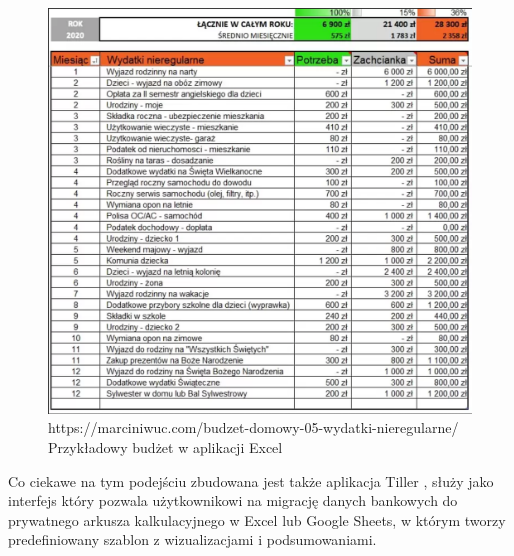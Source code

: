 \documentclass[a4paper,10pt, twoside]{report}
\begin{document}
\begin{large}
\begin{figure}[H]           %
    \centering
    \includegraphics[width=12cm]{figures/marciniwuc.com_Wydatki-nieregularne-plan-roczny.png}
    \caption{https://marciniwuc.com/budzet-domowy-05-wydatki-nieregularne/ Przykładowy budżet w aplikacji Excel}
    \label{fig:budzetprzykladowyexcel}
\end{figure}

{Co ciekawe na tym podejściu zbudowana jest także aplikacja Tiller \cite{tiller},
 służy jako interfejs który pozwala użytkownikowi na migrację danych bankowych 
do prywatnego arkusza kalkulacyjnego w Excel lub Google Sheets, w którym tworzy 
predefiniowany szablon z wizualizacjami i podsumowaniami.}


\end{large}
\end{document}
